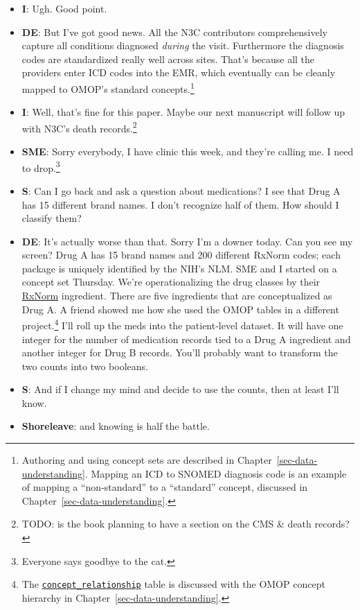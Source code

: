 \documentclass[
  letterpaper,
  DIV=11,
  numbers=noendperiod]{scrreprt}
\begin{document}
\begin{itemize}
  or if their primary care provider uses a siloed EMR.\footnote{The
    benefits and caveats of real-world data are a theme throughout the
    book, particularly in the best practices discussed in
    Chapter~\ref{sec-practices}.}
\item
  \textbf{I}: Ugh. Good point.
\item
  \textbf{DE}: But I've got good news. All the N3C contributors
  comprehensively capture all conditions diagnosed \emph{during} the
  visit. Furthermore the diagnosis codes are standardized really well
  across sites. That's because all the providers enter ICD codes into
  the EMR, which eventually can be cleanly mapped to OMOP's standard
  concepts.\footnote{Authoring and using concept sets are described in
    Chapter~\ref{sec-data-understanding}. Mapping an ICD to SNOMED
    diagnosis code is an example of mapping a ``non-standard'' to a
    ``standard'' concept, discussed in
    Chapter~\ref{sec-data-understanding}.}
\item
  \textbf{I}: Well, that's fine for this paper. Maybe our next
  manuscript will follow up with N3C's death records.\footnote{TODO: is
    the book planning to have a section on the CMS \& death records?}
\item
  \textbf{SME}: Sorry everybody, I have clinic this week, and they're
  calling me. I need to drop.\footnote{Everyone says goodbye to the cat.}
\item
  \textbf{S}: Can I go back and ask a question about medications? I see
  that Drug A has 15 different brand names. I don't recognize half of
  them. How should I classify them?
\item
  \textbf{DE}: It's actually worse than that. Sorry I'm a downer today.
  Can you see my screen? Drug A has 15 brand names and 200 different
  RxNorm codes; each package is uniquely identified by the NIH's NLM.
  SME and I started on a concept set Thursday. We're operationalizing
  the drug classes by their
  \href{https://www.nlm.nih.gov/research/umls/rxnorm/docs/appendix5.html}{RxNorm}
  ingredient. There are five ingredients that are conceptualized as Drug
  A. A friend showed me how she used the OMOP tables in a different
  project.\footnote{The
    \href{https://ohdsi.github.io/CommonDataModel/cdm60.html\#CONCEPT_RELATIONSHIP}{\texttt{concept\_relationship}}
    table is discussed with the OMOP concept hierarchy in
    Chapter~\ref{sec-data-understanding}.} I'll roll up the meds into
  the patient-level dataset. It will have one integer for the number of
  medication records tied to a Drug A ingredient and another integer for
  Drug B records. You'll probably want to transform the two counts into
  two booleans.
\item
  \textbf{S}: And if I change my mind and decide to use the counts, then
  at least I'll know.
\item
  \textbf{Shoreleave}: and knowing is half the battle.
\end{itemize}
\end{document}
